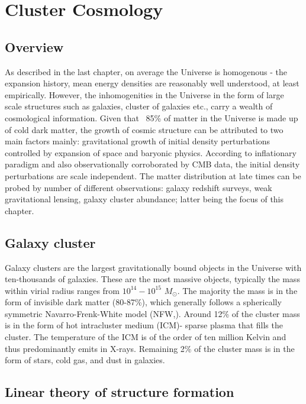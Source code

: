 \chapter{Cluster Cosmology}
\label{ch:clusters}
\section{Overview}
As described in the last chapter, on average the Universe is homogenous - the expansion history, mean energy densities are reasonably well understood, at least empirically. However, the inhomogenities in the Universe in the form of large scale structures such as galaxies, cluster of galaxies etc., carry a wealth of cosmological information. Given that ~85\% of matter in the Universe is made up of cold dark matter, the growth of cosmic structure can be attributed to two main factors mainly: gravitational growth of initial density perturbations controlled by expansion of space and baryonic physics. According to inflationary paradigm and also observationally corroborated by CMB data, the initial density perturbations are scale independent. The matter distribution at late times can be probed by number of different observations: galaxy redshift surveys, weak gravitational lensing, galaxy cluster abundance; latter being the focus of this chapter. 

\section{Galaxy cluster}
Galaxy clusters are the largest gravitationally bound objects in the Universe with ten-thousands of galaxies. 
These are the most massive objects, typically the mass within virial radius ranges from $10^{14} - 10^{15}$ $M_{\odot}$. 
The majority the mass is in the form of invisible dark matter (80-87\%), which generally follows a spherically symmetric Navarro-Frenk-White model (NFW,). 
Around 12\% of the cluster mass is in the form of hot intracluster medium (ICM)- sparse plasma that fills the cluster. 
The temperature of the ICM is of the order of ten million Kelvin and thus predominantly emits in X-rays. 
Remaining 2\% of the cluster mass is in the form of stars, cold gas, and dust in galaxies.

\section{Linear theory of structure formation}

